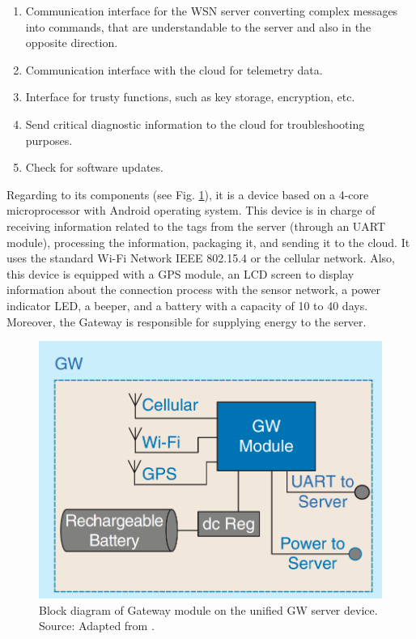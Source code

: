 \documentclass[journal]{IEEEtran}	%
\begin{document}
\begin{enumerate}

\item Communication interface for the WSN server converting complex messages into commands, that are understandable to the server and also in the opposite direction.
\item Communication interface with the cloud for telemetry data.
\item Interface for trusty functions, such as key storage, encryption, etc.
\item Send critical diagnostic information to the cloud for troubleshooting purposes.
\item Check for software updates.
\end{enumerate}

Regarding to its components (see Fig. \ref{fig:gateway}), it is a device based on a 4-core microprocessor with Android operating system. This device is in charge of receiving information related to the tags from the server (through an UART module), processing the information, packaging it, and sending it to the cloud. It uses the standard Wi-Fi Network IEEE 802.15.4 or the cellular network. Also, this device is equipped with a GPS module, an LCD screen to display information about the connection process with the sensor network, a power indicator LED, a beeper, and a battery with a capacity of 10 to 40 days. Moreover, the Gateway is responsible for supplying energy to the server.

\begin{figure}[t!]
\centering
\includegraphics[width=0.9\columnwidth]{fig4.png}
\caption{Block diagram of Gateway module on the unified GW server device. Source: Adapted from \cite{williams2017weaving}.}
\label{fig:gateway}
\end{figure}
\end{document}
